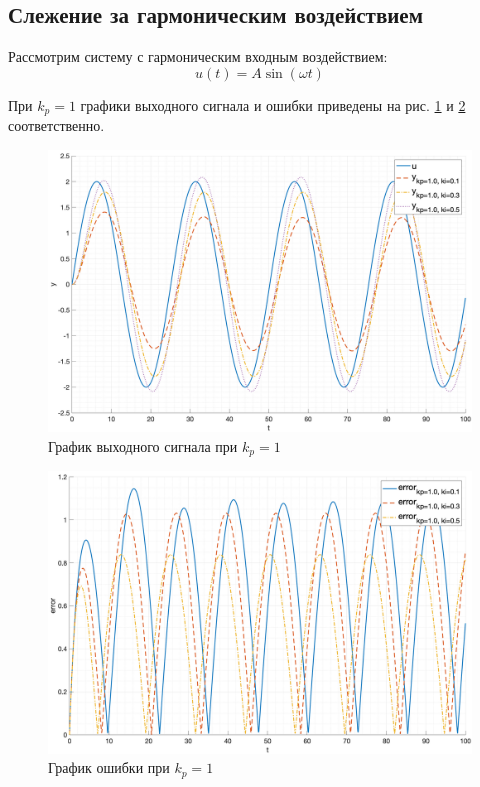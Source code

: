 \FloatBarrier
\subsection{Слежение за гармоническим воздействием}

Рассмотрим систему с гармоническим входным воздействием:
\begin{equation}
    u(t) = A\sin(\omega t)
\end{equation}

При $k_p = 1$ графики выходного сигнала и ошибки приведены
на рис. \ref{fig:task5_out4} и \ref{fig:task5_error4} соответственно.

\begin{figure}[ht!]
    \centering
    \includegraphics[width=\textwidth]{media/plots/task5_out_kp_1.0_2.png}
    \caption{График выходного сигнала при $k_p = 1$}
    \label{fig:task5_out4}
\end{figure}

\begin{figure}[ht!]
    \centering
    \includegraphics[width=\textwidth]{media/plots/task5_error_kp_1.0_2.png}
    \caption{График ошибки при $k_p = 1$}
    \label{fig:task5_error4}
\end{figure}

